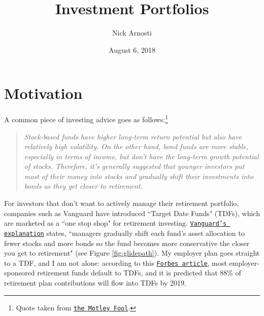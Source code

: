 \documentclass[11pt, oneside]{article}   	%
\title{\vspace{-.3 in} Investment Portfolios}
\author{Nick Arnosti}
\date{August 6, 2018}							%
\begin{document}
\maketitle


\section{Motivation}

A common piece of investing advice goes as follows:\footnote{Quote taken from {\color{blue} \tt{\href{https://www.fool.com/retirement/2016/07/04/why-vanguard-target-date-funds-are-the-best-in-the.aspx}{\underline{the Motley Fool}}}}.}

\begin{quote}
\it Stock-based funds have higher long-term return potential but also have relatively high volatility. On the other hand, bond funds are more stable, especially in terms of income, but don't have the long-term growth potential of stocks. Therefore, it's generally suggested that younger investors put most of their money into stocks and gradually shift their investments into bonds as they get closer to retirement.
\end{quote} %


For investors that don't want to actively manage their retirement portfolio, companies such as Vanguard have introduced ``Target Date Funds" (TDFs), which are marketed as a ``one stop shop" for retirement investing. {\color{blue} \tt{\href{https://investor.vanguard.com/mutual-funds/target-retirement/#/}{\underline{Vanguard's explanation}}}} states,  ``managers gradually shift each fund's asset allocation to fewer stocks and more bonds so the fund becomes more conservative the closer you get to retirement" (see Figure \ref{fig:glidepath}). 
My employer plan goes straight to a TDF, and I am not alone: according to this {\color{blue} \tt \href{https://www.forbes.com/sites/markavallone/2018/06/30/why-target-date-funds-dominate-the-401k-market/#8081c8758687}{\underline{Forbes article}}}, most employer-sponsored retirement funds default to TDFs, and it is predicted that 88\% of retirement plan contributions will flow into TDFs by 2019.
\end{document}
